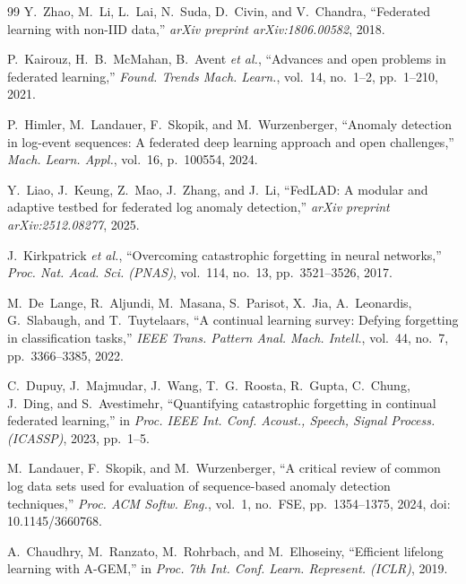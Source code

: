 \documentclass[journal]{IEEEtran}
\begin{document}
\begin{thebibliography}{99}
Y.~Zhao, M.~Li, L.~Lai, N.~Suda, D.~Civin, and V.~Chandra, ``Federated learning with non-IID
data,'' \emph{arXiv preprint arXiv:1806.00582}, 2018.

P.~Kairouz, H.~B.~McMahan, B.~Avent \emph{et al.}, ``Advances and open problems in federated
learning,'' \emph{Found. Trends Mach. Learn.}, vol.~14, no.~1--2, pp.~1--210, 2021.

P.~Himler, M.~Landauer, F.~Skopik, and M.~Wurzenberger, ``Anomaly detection in log-event
sequences: A federated deep learning approach and open challenges,'' \emph{Mach. Learn. Appl.},
vol.~16, p.~100554, 2024.

Y.~Liao, J.~Keung, Z.~Mao, J.~Zhang, and J.~Li, ``FedLAD: A modular and adaptive testbed for
federated log anomaly detection,'' \emph{arXiv preprint arXiv:2512.08277}, 2025.

J.~Kirkpatrick \emph{et al.}, ``Overcoming catastrophic forgetting in neural networks,''
\emph{Proc. Nat. Acad. Sci. (PNAS)}, vol.~114, no.~13, pp.~3521--3526, 2017.

M.~De~Lange, R.~Aljundi, M.~Masana, S.~Parisot, X.~Jia, A.~Leonardis, G.~Slabaugh, and
T.~Tuytelaars, ``A continual learning survey: Defying forgetting in classification tasks,''
\emph{IEEE Trans. Pattern Anal. Mach. Intell.}, vol.~44, no.~7, pp.~3366--3385, 2022.

C.~Dupuy, J.~Majmudar, J.~Wang, T.~G.~Roosta, R.~Gupta, C.~Chung, J.~Ding, and S.~Avestimehr,
``Quantifying catastrophic forgetting in continual federated learning,'' in \emph{Proc. IEEE Int.
Conf. Acoust., Speech, Signal Process. (ICASSP)}, 2023, pp.~1--5.

M.~Landauer, F.~Skopik, and M.~Wurzenberger, ``A critical review of common log data sets used for
evaluation of sequence-based anomaly detection techniques,'' \emph{Proc. ACM Softw. Eng.},
vol.~1, no.~FSE, pp.~1354--1375, 2024, doi: 10.1145/3660768.

A.~Chaudhry, M.~Ranzato, M.~Rohrbach, and M.~Elhoseiny, ``Efficient lifelong learning with A-GEM,''
in \emph{Proc. 7th Int. Conf. Learn. Represent. (ICLR)}, 2019.

\end{thebibliography}
\end{document}
